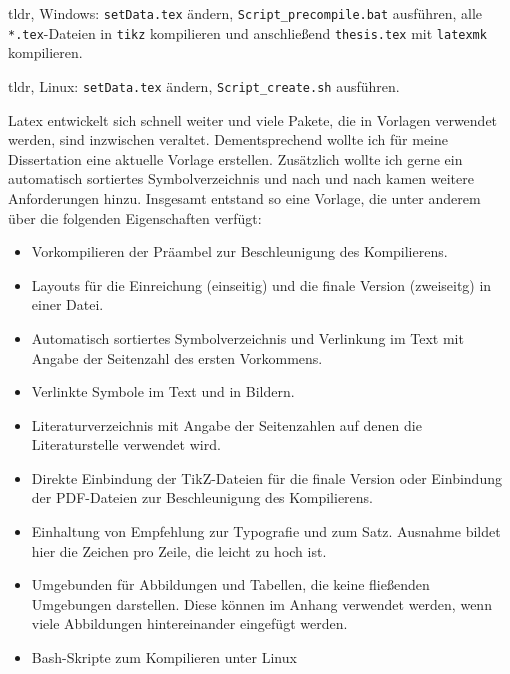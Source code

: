 
tldr, Windows: \texttt{setData.tex} ändern, \texttt{Script\_precompile.bat} ausführen, alle \texttt{*.tex}-Dateien in \texttt{tikz} kompilieren und anschließend \texttt{thesis.tex} mit \texttt{latexmk} kompilieren.

tldr, Linux: \texttt{setData.tex} ändern, \texttt{Script\_create.sh} ausführen.

Latex entwickelt sich schnell weiter und viele Pakete, die in Vorlagen verwendet werden, sind inzwischen veraltet. Dementsprechend wollte ich für meine Dissertation eine aktuelle Vorlage erstellen. Zusätzlich wollte ich gerne ein automatisch sortiertes Symbolverzeichnis und nach und nach kamen weitere Anforderungen hinzu. Insgesamt entstand so eine Vorlage, die unter anderem über die folgenden Eigenschaften verfügt:

\begin{itemize}
	\item Vorkompilieren der Präambel zur Beschleunigung des Kompilierens.
	\item Layouts für die Einreichung (einseitig) und die finale Version (zweiseitg) in einer Datei.
	\item Automatisch sortiertes Symbolverzeichnis und Verlinkung im Text mit Angabe der Seitenzahl des ersten Vorkommens.
	\item Verlinkte Symbole im Text und in Bildern.
	\item Literaturverzeichnis mit Angabe der Seitenzahlen auf denen die Literaturstelle verwendet wird.
	\item Direkte Einbindung der TikZ-Dateien für die finale Version oder Einbindung der PDF-Dateien zur Beschleunigung des Kompilierens.
	\item Einhaltung von Empfehlung zur Typografie und zum Satz. Ausnahme bildet hier die Zeichen pro Zeile, die leicht zu hoch ist.
	\item Umgebunden für Abbildungen und Tabellen, die keine fließenden Umgebungen darstellen. Diese können im Anhang verwendet werden, wenn viele Abbildungen hintereinander eingefügt werden.
	\item Bash-Skripte zum Kompilieren unter Linux
\end{itemize}